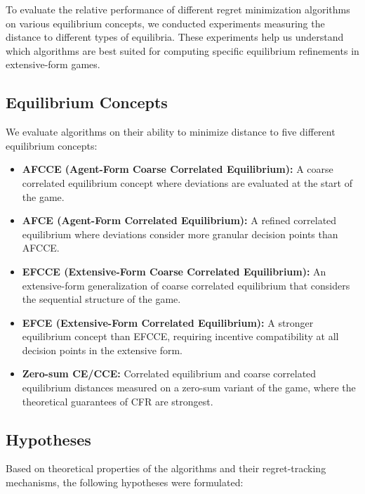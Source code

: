 \documentclass[11pt]{article}
\begin{document}
To evaluate the relative performance of different regret minimization algorithms on various equilibrium concepts, we conducted experiments measuring the distance to different types of equilibria. These experiments help us understand which algorithms are best suited for computing specific equilibrium refinements in extensive-form games.

\subsection{Equilibrium Concepts}

We evaluate algorithms on their ability to minimize distance to five different equilibrium concepts:

\begin{itemize}
    \item \textbf{AFCCE (Agent-Form Coarse Correlated Equilibrium):} A coarse correlated equilibrium concept where deviations are evaluated at the start of the game.

    \item \textbf{AFCE (Agent-Form Correlated Equilibrium):} A refined correlated equilibrium where deviations consider more granular decision points than AFCCE.

    \item \textbf{EFCCE (Extensive-Form Coarse Correlated Equilibrium):} An extensive-form generalization of coarse correlated equilibrium that considers the sequential structure of the game.

    \item \textbf{EFCE (Extensive-Form Correlated Equilibrium):} A stronger equilibrium concept than EFCCE, requiring incentive compatibility at all decision points in the extensive form.

    \item \textbf{Zero-sum CE/CCE:} Correlated equilibrium and coarse correlated equilibrium distances measured on a zero-sum variant of the game, where the theoretical guarantees of CFR are strongest.
\end{itemize}

\subsection{Hypotheses}

Based on theoretical properties of the algorithms and their regret-tracking mechanisms, the following hypotheses were formulated:
\end{document}
